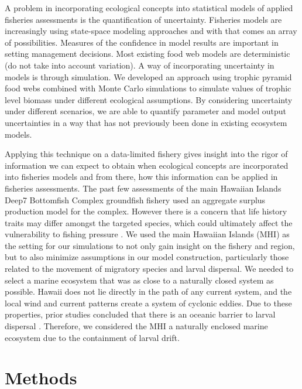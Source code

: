 \documentclass[oneside,12pt,final]{sty/ucthesis-CA2012}
\let\cite\citep                             %
\begin{document}
\begin{mainmatter}
\vspace{5mm}

A problem in incorporating ecological concepts into statistical models of applied fisheries assessments is the quantification of uncertainty. Fisheries models are increasingly using state-space modeling approaches and with that comes an array of possibilities. Measures of the confidence in model results are important in setting management decisions. Most existing food web models are deterministic (do not take into account variation). A way of incorporating uncertainty in models is through simulation. We developed an approach using trophic pyramid food webs combined with Monte Carlo simulations to simulate values of trophic level biomass under different ecological assumptions. By considering uncertainty under different scenarios, we are able to quantify parameter and model output uncertainties in a way that has not previously been done in existing ecosystem models. 

\vspace{5mm}

Applying this technique on a data-limited fishery gives insight into the rigor of information we can expect to obtain when ecological concepts are incorporated into fisheries models and from there, how this information can be applied in fisheries assessments. The past few assessments of the main Hawaiian Islands Deep7 Bottomfish Complex groundfish fishery used an aggregate surplus production model for the complex. However there is a concern that life history traits may differ amongst the targeted species, which could ultimately affect the vulnerability to fishing pressure \cite{brodziak2011stock, langseth2018stock}. We used the main Hawaiian Islands (MHI) as the setting for our simulations to not only gain insight on the fishery and region, but to also minimize assumptions in our model construction, particularly those related to the movement of migratory species and larval dispersal. We needed to select a marine ecosystem that was as close to a naturally closed system as possible. Hawaii does not lie directly in the path of any current system, and the local wind and current patterns create a system of cyclonic eddies. Due to these properties, prior studies concluded that there is an oceanic barrier to larval dispersal \cite{lobel1986transport, vermeij1987dispersal, hourigan1987mid}. Therefore, we considered the MHI a naturally enclosed marine ecosystem due to the containment of larval drift.


\section{Methods}

\end{mainmatter}
\end{document}
